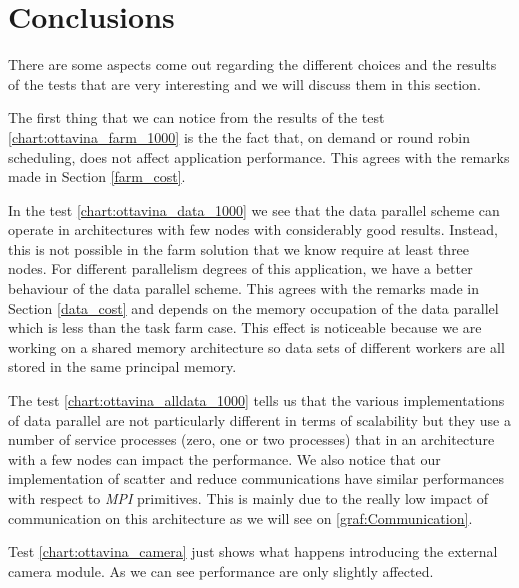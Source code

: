 \section{Conclusions}

There are some aspects come out regarding the different choices and the results of the tests that are very interesting and we will discuss them in this section.

The first thing that we can notice from the results of the test \ref{chart:ottavina_farm_1000} is the the fact that, on demand or round robin scheduling, does not affect application performance.
This agrees with the remarks made in Section \ref{farm_cost}.

In the test \ref{chart:ottavina_data_1000} we see that the data parallel scheme can operate in architectures with few nodes with considerably good results.
Instead, this is not possible in the farm solution that we know require at least three nodes. 
For different parallelism degrees of this application, we have a better behaviour of the data parallel scheme. 
This agrees with the remarks made in Section \ref{data_cost} and depends on the memory occupation of the data parallel which is less than the task farm case. 
This effect is noticeable because we are working on a shared memory architecture so data sets of different workers are all stored in the same principal memory.

The test \ref{chart:ottavina_alldata_1000} tells us that the various implementations of data parallel are not particularly different in terms of scalability but they use a number of service processes (zero, one or two processes) that in an architecture with a few nodes can impact the performance.
We also notice that our implementation of scatter and reduce communications have similar performances with respect to \textit{MPI} primitives.
This is mainly due to the really low impact of communication on this architecture as we will see on \ref{graf:Communication}.

Test \ref{chart:ottavina_camera} just shows what happens introducing the external camera module. 
As we can see performance are only slightly affected.



